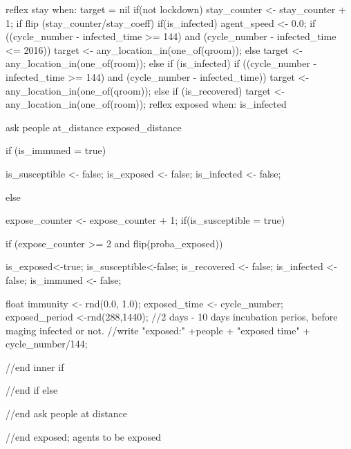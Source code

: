 \begin{verbatimtab}[4]
{{{    
        }
        reflex stay when: target = nil{
            if(not lockdown){
                stay_counter <- stay_counter + 1;
                if flip (stay_counter/stay_coeff){
                    if(is_infected){
                        agent_speed <- 0.0;
                        if ((cycle_number - infected_time >= 144) and (cycle_number - infected_time <= 2016)){
                            target <- any_location_in(one_of(qroom));
                        } else {
                            target <- any_location_in(one_of(room));
                        }
                    }
                } else {
                    if (is_infected){
                        if ((cycle_number - infected_time >= 144) and (cycle_number - infected_time)){
                            target <- any_location_in(one_of(qroom));
                        }
                    }else if (is_recovered){
                        target <- any_location_in(one_of(room));
                    }
                }
            }
        }
        reflex exposed when: is_infected{
                ask people at_distance exposed_distance {
                    if (is_immuned = true){
                        
                        is_susceptible <- false;
                        is_exposed <- false;
                        is_infected <- false;
                    }else {
                        expose_counter <- expose_counter + 1;
                        if(is_susceptible = true){
                            if (expose_counter >= 2 and flip(proba_exposed)){
                            is_exposed<-true;
                            is_susceptible<-false;
                            is_recovered <- false;
                            is_infected <- false;
                            is_immuned <- false;
                            
                            float immunity <- rnd(0.0, 1.0);
                               exposed_time <- cycle_number;
                               exposed_period <-rnd(288,1440); //2 days - 10 days incubation
                                perios, before maging infected or not.
                               //write "exposed:" +people + "exposed time" + cycle_number/144;
                            } //end inner if
                        }
                    } //end if else
                    
                    
                        
                 }//end ask people at distance
            }//end exposed; agents to be exposed
               
}}
\end{verbatimtab}
